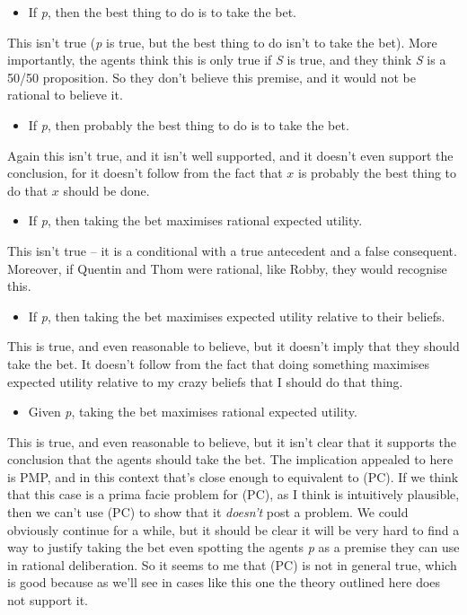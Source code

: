 \documentclass[
  11pt,
  letterpaper,
  DIV=11,
  numbers=noendperiod,
  oneside]{scrartcl}
\providecommand{\tightlist}{%
  \setlength{\itemsep}{0pt}\setlength{\parskip}{0pt}}\usepackage{longtable,booktabs,array}
\begin{document}
\begin{itemize}
\tightlist
\item
  If \emph{p}, then the best thing to do is to take the bet.
\end{itemize}

This isn't true (\emph{p} is true, but the best thing to do isn't to
take the bet). More importantly, the agents think this is only true if
\emph{S} is true, and they think \emph{S} is a 50/50 proposition. So
they don't believe this premise, and it would not be rational to believe
it.

\begin{itemize}
\tightlist
\item
  If \emph{p}, then probably the best thing to do is to take the bet.
\end{itemize}

Again this isn't true, and it isn't well supported, and it doesn't even
support the conclusion, for it doesn't follow from the fact that \(x\)
is probably the best thing to do that \(x\) should be done.

\begin{itemize}
\tightlist
\item
  If \emph{p}, then taking the bet maximises rational expected utility.
\end{itemize}

This isn't true -- it is a conditional with a true antecedent and a
false consequent. Moreover, if Quentin and Thom were rational, like
Robby, they would recognise this.

\begin{itemize}
\tightlist
\item
  If \emph{p}, then taking the bet maximises expected utility relative
  to their beliefs.
\end{itemize}

This is true, and even reasonable to believe, but it doesn't imply that
they should take the bet. It doesn't follow from the fact that doing
something maximises expected utility relative to my crazy beliefs that I
should do that thing.

\begin{itemize}
\tightlist
\item
  Given \emph{p}, taking the bet maximises rational expected utility.
\end{itemize}

This is true, and even reasonable to believe, but it isn't clear that it
supports the conclusion that the agents should take the bet. The
implication appealed to here is PMP, and in this context that's close
enough to equivalent to (PC). If we think that this case is a prima
facie problem for (PC), as I think is intuitively plausible, then we
can't use (PC) to show that it \emph{doesn't} post a problem. We could
obviously continue for a while, but it should be clear it will be very
hard to find a way to justify taking the bet even spotting the agents
\emph{p} as a premise they can use in rational deliberation. So it seems
to me that (PC) is not in general true, which is good because as we'll
see in cases like this one the theory outlined here does not support it.
\end{document}
